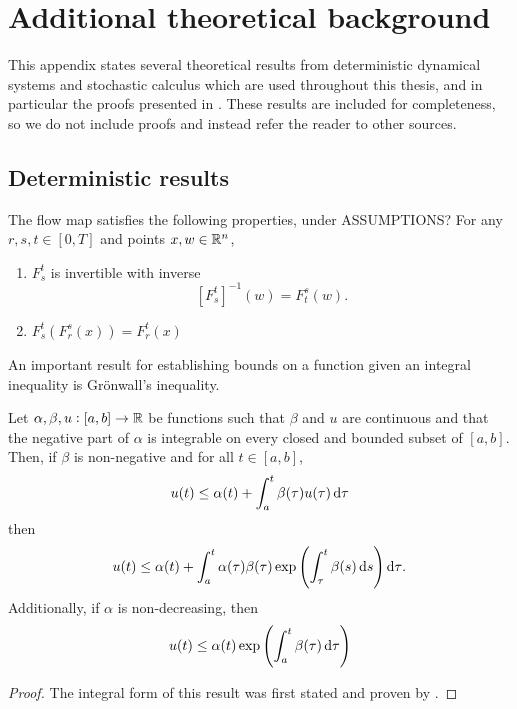 \chapter{Additional theoretical background}
This appendix states several theoretical results from deterministic dynamical systems and stochastic calculus which are used throughout this thesis, and in particular the proofs presented in .
These results are included for completeness, so we do not include proofs and instead refer the reader to other sources.

\section{Deterministic results}
The flow map satisfies the following properties, under ASSUMPTIONS?
For any \(r, s, t \in [0,T]\) and points \(x,w \in \mathbb{R}^n\),
\begin{enumerate}
	\item \(F_{s}^{t}\) is invertible with inverse
	      \[
		      \left[F_{s}^{t}\right]^{-1}\left(w\right) = F_{t}^{s}\left(w\right).
	      \]
	\item \(F_s^{t}\left(F_{r}^{s}(x)\right) = F_{r}^{t}\left(x\right)\)
\end{enumerate}


An important result for establishing bounds on a function given an integral inequality is Gr\"onwall's inequality.

\begin{theorem}\label{thm:gronwall}
	Let \(\alpha, \beta, u: [a,b] \to \mathbb{R}\) be functions such that \(\beta\) and \(u\) are continuous and that the negative part of \(\alpha\) is integrable on every closed and bounded subset of \([a,b]\).
	Then, if \(\beta\) is non-negative and for all \(t \in [a,b]\),
	\[
		u(t) \leq \alpha(t) + \int_a^t{\beta(\tau)u(\tau)\dif\tau}
	\]
	then
	\[
		u(t) \leq \alpha(t) + \int_a^t{\alpha(\tau)\beta(\tau)\exp\left(\int_\tau^{t}{\beta(s)\dif s}\right)\dif\tau}.
	\]
	Additionally, if \(\alpha\) is non-decreasing, then
	\[
		u(t) \leq \alpha(t) \exp\left(\int_a^t{\beta(\tau)\dif\tau}\right)
	\]
\end{theorem}
\begin{proof}
	The integral form of this result was first stated and proven by \citet{Bellman_1943_StabilitySolutionsLinear}.
\end{proof}


